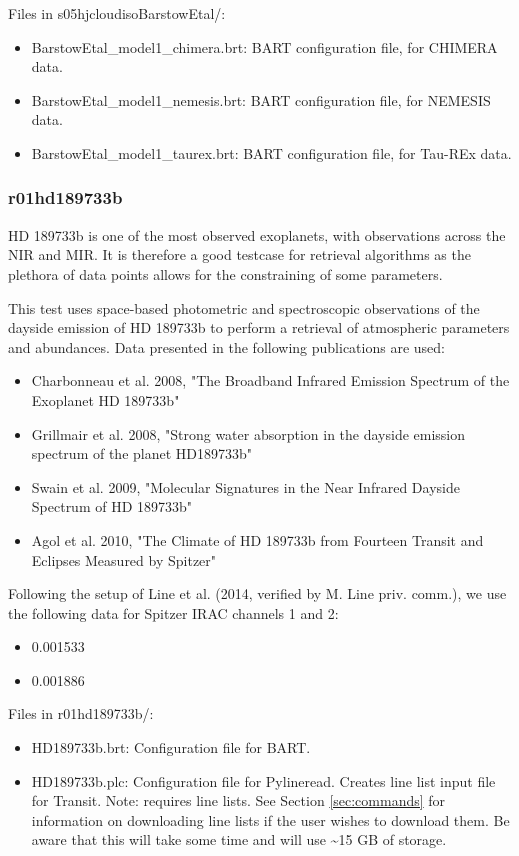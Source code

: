 \documentclass[letterpaper, 12pt]{article}
\begin{document}
Files in s05hjcloudisoBarstowEtal/:
\begin{itemize} \itemsep0pt
  \item BarstowEtal{\_}model1{\_}chimera.brt: BART configuration file, for CHIMERA data.
  \item BarstowEtal{\_}model1{\_}nemesis.brt: BART configuration file, for NEMESIS data.
  \item BarstowEtal{\_}model1{\_}taurex.brt:  BART configuration file, for Tau-REx data.
\end{itemize}

\subsubsection{r01hd189733b}
\label{sec:hd189}
HD 189733b is one of the most observed exoplanets, with observations across the NIR and MIR. 
It is therefore a good testcase for retrieval algorithms as the plethora of 
data points allows for the constraining of some parameters. 

This test uses space-based photometric and spectroscopic observations of the 
dayside emission of HD 189733b to perform a retrieval of atmospheric parameters 
and abundances. Data presented in the following publications are used:
\begin{itemize} \itemsep0pt
  \item Charbonneau et al. 2008, "The Broadband Infrared Emission Spectrum of the Exoplanet HD 189733b"
  \item Grillmair et al. 2008, "Strong water absorption in the dayside emission spectrum of the planet HD189733b"
  \item Swain et al. 2009, "Molecular Signatures in the Near Infrared Dayside Spectrum of HD 189733b"
  \item Agol et al. 2010, "The Climate of HD 189733b from Fourteen Transit and Eclipses Measured by Spitzer"
\end{itemize}

Following the setup of Line et al. (2014, verified by M. Line priv. comm.), 
we use the following data for Spitzer IRAC channels 1 and 2:
\begin{itemize} \itemsep0pt
  \item 0.001533 
  \item 0.001886 
\end{itemize}

Files in r01hd189733b/:
\begin{itemize} \itemsep0pt
  \item HD189733b.brt: Configuration file for BART.
  \item HD189733b.plc: Configuration file for Pylineread. Creates 
        line list input file for Transit. Note: requires line lists. See 
        Section \ref{sec:commands} for information on downloading line lists if 
        the user wishes to download them. Be aware that this will take some 
        time and will use {\sim}15 GB of storage.
\end{itemize}
\end{document}
